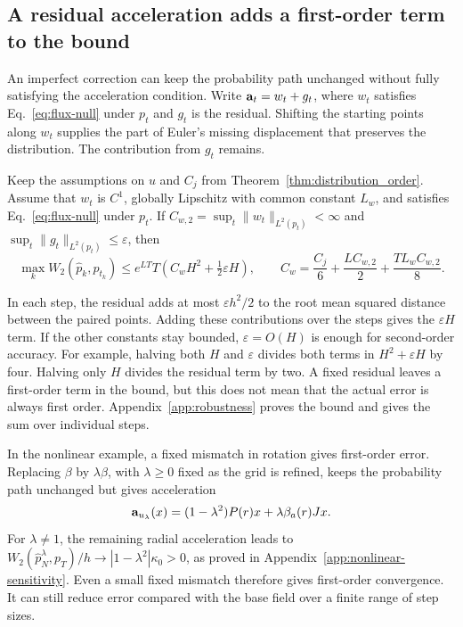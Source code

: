\subsection{A residual acceleration adds a first-order term to the bound}

An imperfect correction can keep the probability path unchanged without fully satisfying the acceleration condition. Write $\mathbf a_t=w_t+g_t$, where $w_t$ satisfies Eq.~\eqref{eq:flux-null} under $p_t$ and $g_t$ is the residual. Shifting the starting points along $w_t$ supplies the part of Euler's missing displacement that preserves the distribution. The contribution from $g_t$ remains.
\begin{proposition}
\label{prop:robustness}
Keep the assumptions on $u$ and $C_j$ from Theorem~\ref{thm:distribution_order}. Assume that $w_t$ is $C^1$, globally Lipschitz with common constant $L_w$, and satisfies Eq.~\eqref{eq:flux-null} under $p_t$. If
$C_{w,2}=\sup_t\|w_t\|_{L^2(p_t)}<\infty$ and
$\sup_t\|g_t\|_{L^2(p_t)}\le\varepsilon$, then
\begin{equation}
 \max_kW_2(\widehat p_k,p_{t_k})
 \le e^{LT}T\left(C_wH^2+\tfrac12\varepsilon H\right),
 \qquad C_w=\frac{C_j}{6}+\frac{LC_{w,2}}{2}+\frac{TL_wC_{w,2}}{8}.
 \label{eq:robustness}
\end{equation}
\end{proposition}

In each step, the residual adds at most $\varepsilon h^2/2$ to the root mean squared distance between the paired points. Adding these contributions over the steps gives the $\varepsilon H$ term. If the other constants stay bounded, $\varepsilon=O(H)$ is enough for second-order accuracy. For example, halving both $H$ and $\varepsilon$ divides both terms in $H^2+\varepsilon H$ by four. Halving only $H$ divides the residual term by two. A fixed residual leaves a first-order term in the bound, but this does not mean that the actual error is always first order. Appendix~\ref{app:robustness} proves the bound and gives the sum over individual steps.

In the nonlinear example, a fixed mismatch in rotation gives first-order error. Replacing $\beta$ by $\lambda\beta$, with $\lambda\ge0$ fixed as the grid is refined, keeps the probability path unchanged but gives acceleration
\[
 \mathbf a_{u_\lambda}(x)=(1-\lambda^2)P(r)x+\lambda\beta_a(r)Jx.
\]
For $\lambda\ne1$, the remaining radial acceleration leads to
$W_2(\widehat p_N^\lambda,p_T)/h\to|1-\lambda^2|\kappa_0>0$,
as proved in Appendix~\ref{app:nonlinear-sensitivity}. Even a small fixed mismatch therefore gives first-order convergence. It can still reduce error compared with the base field over a finite range of step sizes.

